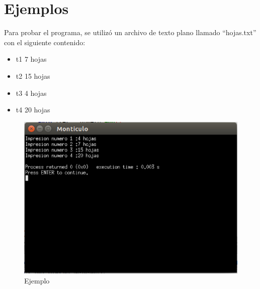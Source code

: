 \documentclass[a4paper,12pt]{article}
\begin{document}
\onecolumn

\section{Ejemplos}

Para probar el programa, se utilizó un archivo de texto plano llamado ``hojas.txt'' con el siguiente contenido:



\begin{itemize}
 \item t1 7 hojas
\item t2 15 hojas
\item t3 4 hojas
\item t4 20 hojas
\end{itemize}

\begin{figure}[h]
 \centering
 \includegraphics[scale=0.5]{imagenes/1.eps}
 \caption{Ejemplo}
\end{figure}
\end{document}
